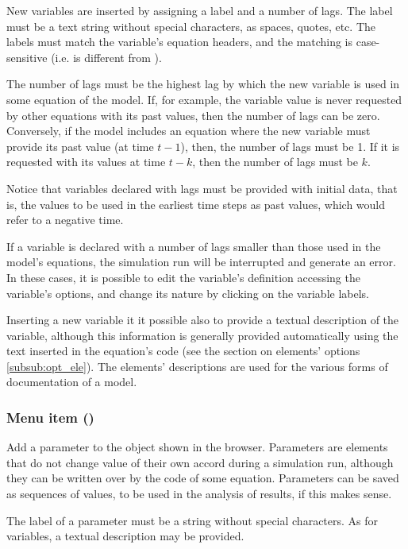 \documentclass [11pt,a4paper] {book}
\begin{document}
New variables are inserted by assigning a label and a number of lags. The label must be a text string without special characters, as spaces, quotes, etc. The labels must match the variable's equation headers, and the matching is case-sensitive (i.e.  is different from ).

The number of lags must be the highest lag by which the new variable is used in some equation of the model. If, for example, the variable value is never requested by other equations with its past values, then the number of lags can be zero. Conversely, if the model includes an equation where the new variable must provide its past value (at time $t-1$), then, the number of lags must be 1. If it is requested with its values at time $t-k$, then the number of lags must be $k$.

Notice that variables declared with lags must be provided with initial data, that is, the values to be used in the earliest time steps as past values, which would refer to a negative time.

If a variable is declared with a number of lags smaller than those used in the model's equations, the simulation run will be interrupted and generate an error. In these cases, it is possible to edit the variable's definition accessing the variable's options, and change its nature by clicking on the variable labels. 

Inserting a new variable it it possible also to provide a textual description of the variable, although this information is generally provided automatically using the text inserted in the equation's code (see the section on elements' options \ref{subsub:opt_ele}). The elements' descriptions are used for the various forms of documentation of a model.


\subsubsection{Menu item  ()}

Add a parameter to the object shown in the browser. Parameters are elements that do not change value of their own accord during a simulation run, although they can be written over by the code of some equation. Parameters can be saved as sequences of values, to be used in the analysis of results, if this makes sense.

The label of a parameter must be a string without special characters. As for variables, a textual description may be provided.
\end{document}
